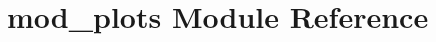 \hypertarget{namespacemod__plots}{}\section{mod\+\_\+plots Module Reference}
\label{namespacemod__plots}
